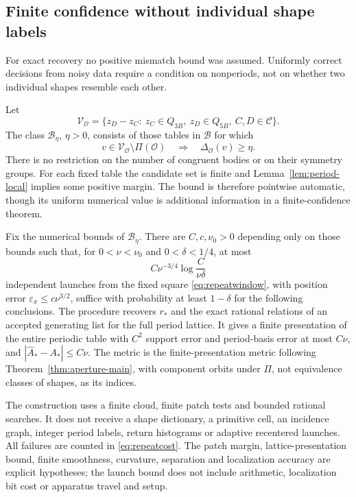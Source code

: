 \subsection{Finite confidence without individual shape labels}
For exact recovery no positive mismatch bound was assumed. Uniformly
correct decisions from noisy data require a condition on nonperiods,
not on whether two individual shapes resemble each other.

\begin{definition}\label{def:repeatmargin}
Let
\[
 \mathcal V_{\mathcal O}
   =\{z_D-z_C:\ z_C\in Q_{3B},\ z_D\in Q_{5B},\ C,D\in\mathcal C\}.
\]
The class $\mathcal B_\eta$, $\eta>0$, consists of those tables in
$\mathcal B$ for which
\begin{equation}\label{eq:repeatmargin}
 v\in\mathcal V_{\mathcal O}\setminus\Pi(\mathcal O)
                \quad\Longrightarrow\quad\Delta_{\mathcal O}(v)\ge\eta.
\end{equation}
There is no restriction on the number of congruent bodies or on their
symmetry groups. For each fixed table the candidate set is finite and
Lemma~\ref{lem:period-local} implies some positive margin. The bound is
therefore pointwise automatic, though its uniform numerical value is
additional information in a finite-confidence theorem.
\end{definition}

\begin{theorem}
\label{thm:repeat-finite}
Fix the numerical bounds of $\mathcal B_\eta$. There are
$C,c,\nu_0>0$ depending only on those bounds such that, for
$0<\nu<\nu_0$ and $0<\delta<1/4$, at most
\begin{equation}\label{eq:repeatcost}
       C\nu^{-3/4}\log\frac{C}{\nu\delta}
\end{equation}
independent launches from the fixed square \eqref{eq:repeatwindow},
with position error $\varepsilon_x\le c\nu^{3/2}$, suffice with
probability at least $1-\delta$ for the following conclusions.
The procedure recovers $r_*$ and the exact rational relations of an
accepted generating list for the full period lattice. It gives a finite
presentation of the entire periodic table with $C^2$ support error and
period-basis error at most $C\nu$, and $|\widehat A_*-A_*|\le C\nu$.
The metric is the finite-presentation metric following
Theorem~\ref{thm:aperture-main}, with component orbits under $\Pi$,
not equivalence classes of shapes, as its indices.

The construction uses a finite cloud, finite patch tests and bounded
rational searches. It does not receive a shape dictionary, a primitive
cell, an incidence graph, integer period labels, return histograms or
adaptive recentered launches. All failures are counted in
\eqref{eq:repeatcost}. The patch margin, lattice-presentation bound,
finite smoothness, curvature, separation and localization accuracy are
explicit hypotheses; the launch bound does not include arithmetic,
localization bit cost or apparatus travel and setup.
\end{theorem}

